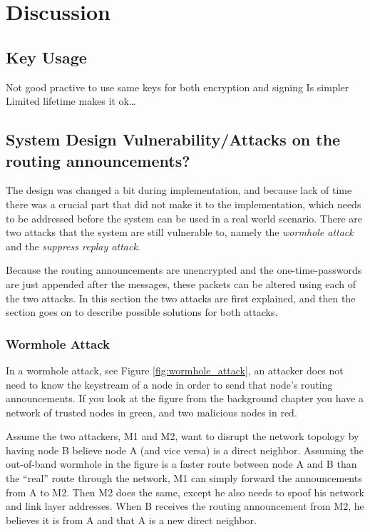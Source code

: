 \chapter{Discussion}
\label{ch:discussion}
\acresetall

\section{Key Usage}
Not good practive to use same keys for both encryption and signing
Is simpler
Limited lifetime makes it ok\ldots

\section{System Design Vulnerability/Attacks on the routing announcements?}
The design was changed a bit during implementation, and because lack of time
there was a crucial part that did not make it to the implementation, which needs
to be addressed before the system can be used in a real world scenario. There
are two attacks that the system are still vulnerable to, namely the
\emph{wormhole attack} and the \emph{suppress replay attack}.

Because the routing announcements are unencrypted and the one-time-passwords
are just appended after the messages, these packets can be altered using each of
the two attacks. In this section the two attacks are first explained, and then
the section goes on to describe possible solutions for both attacks.

\subsection{Wormhole Attack}
In a wormhole attack, see Figure \ref{fig:wormhole_attack}, an attacker does not
need to know the keystream of a node in order to send that node's routing
announcements. If you look at the figure from the background chapter you have a
network of trusted nodes in green, and two malicious nodes in red. 

Assume the two attackers, M1 and M2, want to disrupt the network topology by
having node B believe node A (and vice versa) is a direct neighbor. Assuming the
out-of-band wormhole in the figure is a faster route between node A and B than
the ``real'' route through the network, M1 can simply forward the announcements
from A to M2. Then M2 does the same, except he also needs to spoof his network
and link layer addresses. When B receives the routing announcement from M2, he
believes it is from A and that A is a new direct neighbor.

